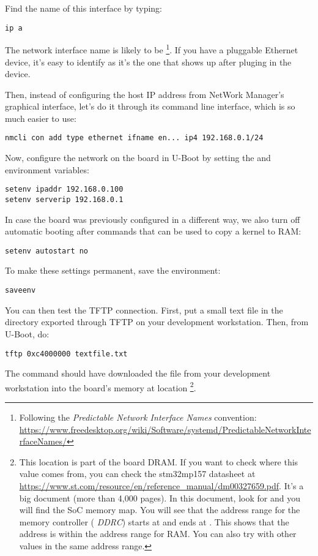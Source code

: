 Find the name of this interface by typing:
\begin{verbatim}
ip a
\end{verbatim}

The network interface name is likely to be
\footnote{Following the {\em Predictable Network Interface
Names} convention:
\url{https://www.freedesktop.org/wiki/Software/systemd/PredictableNetworkInterfaceNames/}}.
If you have a pluggable Ethernet device, it's easy to identify as it's
the one that shows up after pluging in the device.

Then, instead of configuring the host IP address from NetWork Manager’s graphical interface,
let’s do it through its command line interface, which is so much easier to use:

\begin{verbatim}
nmcli con add type ethernet ifname en... ip4 192.168.0.1/24
\end{verbatim}

Now, configure the network on the board in U-Boot by setting the 
and  environment variables:

\begin{verbatim}
setenv ipaddr 192.168.0.100
setenv serverip 192.168.0.1
\end{verbatim}

In case the board was previously configured in a different way, we
also turn off automatic booting after commands that can be used to
copy a kernel to RAM:

\begin{verbatim}
setenv autostart no
\end{verbatim}

To make these settings permanent, save the environment:

\begin{verbatim}
saveenv
\end{verbatim}

You can then test the TFTP connection. First, put a small text file in
the directory exported through TFTP on your development
workstation. Then, from U-Boot, do:

\begin{verbatim}
tftp 0xc4000000 textfile.txt
\end{verbatim}

The  command should have downloaded the
 file from your development workstation into
the board's memory at location \footnote{
This location is part of the board DRAM. If you want
to check where this value comes from, you can check the stm32mp157
datasheet at
\url{https://www.st.com/resource/en/reference_manual/dm00327659.pdf}.
It's a big document (more than 4,000 pages). In this document, look
for  and you will find the SoC memory map.
You will see that the address range for the memory controller ({\em
DDRC}) starts at  and ends at . This
shows that the  address is within the address range
for RAM. You can also try with other values in the same address range.}.


